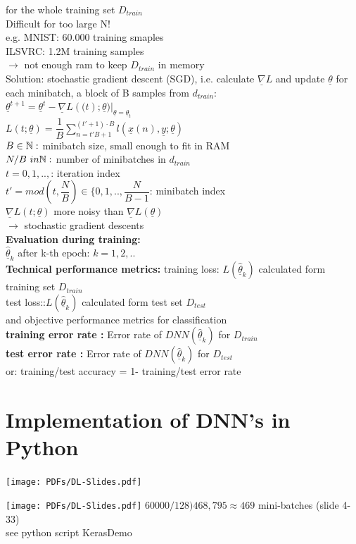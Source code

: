for the whole training set $ D_{train} $ \\
Difficult for too large N!\\
e.g. MNIST: 60.000 training smaples \\
ILSVRC: 1.2M training samples \\
$\rightarrow$ not enough ram to keep $ D_{train} $ in memory \\
Solution: stochastic gradient descent (SGD), i.e. calculate $ \underline{\nabla}L $ and update $ \underline{\theta} $ for each minibatch, a block of B samples from $ d_{train} $: \\
$ \underline{\theta}^{t+1} = \underline{\theta}^t - \underline{\nabla}L (\mathbf(t); \underline{\theta})|_{\underline{\theta} = \underline{\theta}_t} $\\
$ L(t; \underline{\theta}) =  \dfrac{1}{B} \sum_{n=t'B+1}^{(t' +1) \cdot B} l (\underline{x}(n), \underline{y} ; \underline{\theta})$ \\
$  B \in \mathbb N: $ minibatch size, small enough to fit in RAM \\
$ N/B \ in \mathbb N:  $ number of minibatches in $ d_{train} $ \\
$  t = 0,1 ,..,  $: iteration index \\
$  t' = mod(t, \dfrac{N}{B}) \in \lbrace 0,1,.., \dfrac{N}{B-1} $: minibatch index \\
$  \underline{\nabla } L (t; \underline{\theta}) $ more noisy than $\underline{\nabla} L (\underline{\theta} )$\\
$\rightarrow$ stochastic gradient descents \\
\textbf{Evaluation during training:} \\
$  \hat{ \underline{\theta}}_k  $ after k-th epoch: $  k = 1,2,.. $ \\
\textbf{Technical performance metrics:}
\textbullet training loss: $  L(\hat{\underline{\theta}}_k) $ calculated form training set $ D_{train} $\\
\textbullet test loss::$ L(\hat{\underline{\theta}}_k) $ calculated form test set $ D_{test} $\\
and objective performance metrics for classification \\
\textbullet \textbf{training error rate :} Error rate of $ DNN( \hat{\underline{\theta}}_k) $ for $ D_{train} $\\
\textbullet \textbf{test error rate :} Error rate of $ DNN( \hat{\underline{\theta}}_k) $ for $ D_{test} $\\
or:
\textbullet training/test accuracy =   1- training/test error rate 
\section{Implementation of DNN's in Python}
\texttt{[image: PDFs/DL-Slides.pdf]}

\texttt{[image: PDFs/DL-Slides.pdf]}
\textbullet $ 60000/ 128 ) 468,795 \approx 469 $ mini-batches (slide 4-33)\\
\textbullet see python script KerasDemo